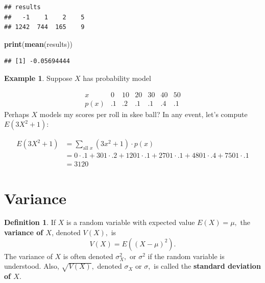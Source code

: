 \documentclass[
]{book}
\newenvironment{Shaded}{\begin{snugshade}}{\end{snugshade}}
\newcommand{\FunctionTok}[1]{\textcolor[rgb]{0.13,0.29,0.53}{\textbf{#1}}}
\newcommand{\NormalTok}[1]{#1}
\theoremstyle{definition}
\newtheorem{definition}{Definition}[chapter]
\theoremstyle{definition}
\newtheorem{example}{Example}[chapter]
\theoremstyle{definition}
\theoremstyle{definition}
\theoremstyle{remark}
\begin{document}
\begin{verbatim}
## results
##   -1    1    2    5 
## 1242  744  165    9
\end{verbatim}

\begin{Shaded}
\begin{Highlighting}[]
\FunctionTok{print}\NormalTok{(}\FunctionTok{mean}\NormalTok{(results))}
\end{Highlighting}
\end{Shaded}

\begin{verbatim}
## [1] -0.05694444
\end{verbatim}

\begin{example}
Suppose \(X\) has probability model

\[
\begin{array}{c|c|c|c|c|c|c}
x & 0 & 10 & 20 & 30 & 40 & 50\\ \hline
p(x) & .1 & .2 & .1 & .1 & .4 & .1  
\end{array}
\]
Perhaps \(X\) models my scores per roll in skee ball? In any event, let's compute \(E(3X^2 + 1)\):

\begin{align*}
E(3X^2 + 1) &= \sum_{\text{all }x} (3x^2 + 1)\cdot p(x)\\
&= 0 \cdot .1 + 301\cdot .2 + 1201\cdot .1 + 2701 \cdot .1 + 4801 \cdot .4 + 7501 \cdot .1\\
&= 3120
\end{align*}
\end{example}

\section{Variance}\label{variance}

\begin{definition}
\protect\hypertarget{def:variance-discrete}{}\label{def:variance-discrete}If \(X\) is a random variable with expected value \(E(X) = \mu,\) the \textbf{variance of \(X\)}, denoted \(V(X),\) is \[V(X) = E((X-\mu)^2).\]
The variance of \(X\) is often denoted \(\sigma^2_X,\) or \(\sigma^2\) if the random variable is understood. Also, \(\sqrt{V(X)},\) denoted \(\sigma_X\) or \(\sigma,\) is called the \textbf{standard deviation of \(X\)}.
\end{definition}
\end{document}
